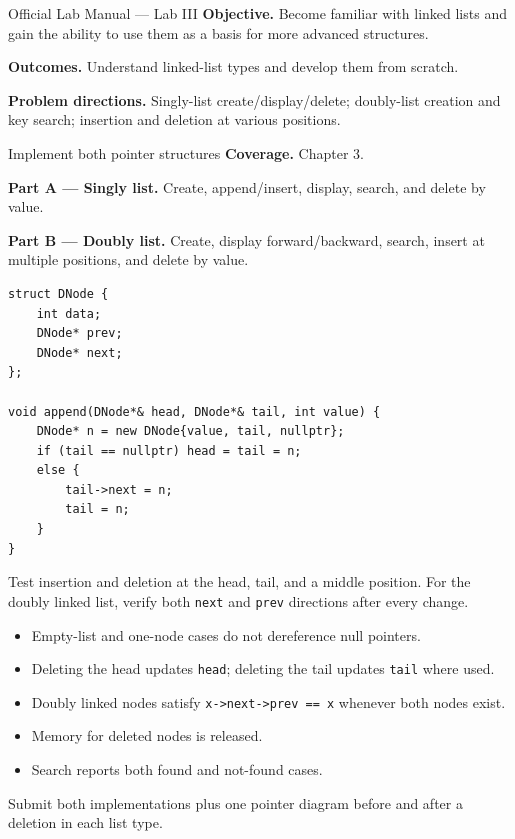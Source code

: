 
\begin{sourcealignment}{Official Lab Manual --- Lab III}
\textbf{Objective.} Become familiar with linked lists and gain the ability to use them as a basis for more advanced structures.

\textbf{Outcomes.} Understand linked-list types and develop them from scratch.

\textbf{Problem directions.} Singly-list create/display/delete; doubly-list creation and key search; insertion and deletion at various positions.
\end{sourcealignment}

\begin{labproject}{Implement both pointer structures}
\textbf{Coverage.} Chapter 3.

\textbf{Part A --- Singly list.} Create, append/insert, display, search, and delete by value.

\textbf{Part B --- Doubly list.} Create, display forward/backward, search, insert at multiple positions, and delete by value.

\begin{lstlisting}
struct DNode {
    int data;
    DNode* prev;
    DNode* next;
};

void append(DNode*& head, DNode*& tail, int value) {
    DNode* n = new DNode{value, tail, nullptr};
    if (tail == nullptr) head = tail = n;
    else {
        tail->next = n;
        tail = n;
    }
}
\end{lstlisting}

\begin{tryit}
Test insertion and deletion at the head, tail, and a middle position. For the doubly linked list, verify both \texttt{next} and \texttt{prev} directions after every change.
\end{tryit}
\end{labproject}

\begin{verification}
\begin{itemize}
  \item Empty-list and one-node cases do not dereference null pointers.
  \item Deleting the head updates \texttt{head}; deleting the tail updates \texttt{tail} where used.
  \item Doubly linked nodes satisfy \texttt{x->next->prev == x} whenever both nodes exist.
  \item Memory for deleted nodes is released.
  \item Search reports both found and not-found cases.
\end{itemize}
\end{verification}

\begin{labdeliverable}
Submit both implementations plus one pointer diagram before and after a deletion in each list type.
\end{labdeliverable}

